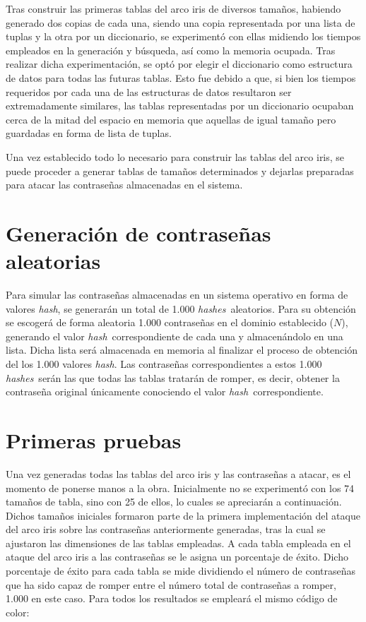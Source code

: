 \documentclass[12pt,spanish,listoffigures,listoftables]{tfgetsinf}
\newcommand{\hash}{\textit{hash}}
\newcommand{\hashes}{\textit{hashes}}
\begin{document}
Tras construir las primeras tablas del arco iris de diversos tamaños, habiendo generado dos copias de cada una, siendo una copia representada por una lista de tuplas y la otra por un diccionario, se experimentó con ellas midiendo los tiempos empleados en la generación y búsqueda, así como la memoria ocupada. Tras realizar dicha experimentación, se optó por elegir el diccionario como estructura de datos para todas las futuras tablas. Esto fue debido a que, si bien los tiempos requeridos por cada una de las estructuras de datos resultaron ser extremadamente similares, las tablas representadas por un diccionario ocupaban cerca de la mitad del espacio en memoria que aquellas de igual tamaño pero guardadas en forma de lista de tuplas.

Una vez establecido todo lo necesario para construir las tablas del arco iris, se puede proceder a generar tablas de tamaños determinados y dejarlas preparadas para atacar las contraseñas almacenadas en el sistema.
~\\
    
\section{Generación de contraseñas aleatorias} \label{contraseñas}

Para simular las contraseñas almacenadas en un sistema operativo en forma de valores \hash, se generarán un total de 1.000 \hashes~aleatorios. Para su obtención se escogerá de forma aleatoria 1.000 contraseñas en el dominio establecido ($N$), generando el valor \hash~correspondiente de cada una y almacenándolo en una lista. Dicha lista será almacenada en memoria al finalizar el proceso de obtención del los 1.000 valores \hash. Las contraseñas correspondientes a estos 1.000 \hashes~serán las que todas las tablas tratarán de romper, es decir, obtener la contraseña original únicamente conociendo el valor \hash~correspondiente.
~\\

\section{Primeras pruebas} \label{primeras pruebas}

Una vez generadas todas las tablas del arco iris y las contraseñas a atacar, es el momento de ponerse manos a la obra. Inicialmente no se experimentó con los 74 tamaños de tabla, sino con 25 de ellos, lo cuales se apreciarán a continuación. Dichos tamaños iniciales formaron parte de la primera implementación del ataque del arco iris sobre las contraseñas anteriormente generadas, tras la cual se ajustaron las dimensiones de las tablas empleadas. A cada tabla empleada en el ataque del arco iris a las contraseñas se le asigna un porcentaje de éxito. Dicho porcentaje de éxito para cada tabla se mide dividiendo el número de contraseñas que ha sido capaz de romper entre el número total de contraseñas a romper, 1.000 en este caso. Para todos los resultados se empleará el mismo código de color:
\end{document}
